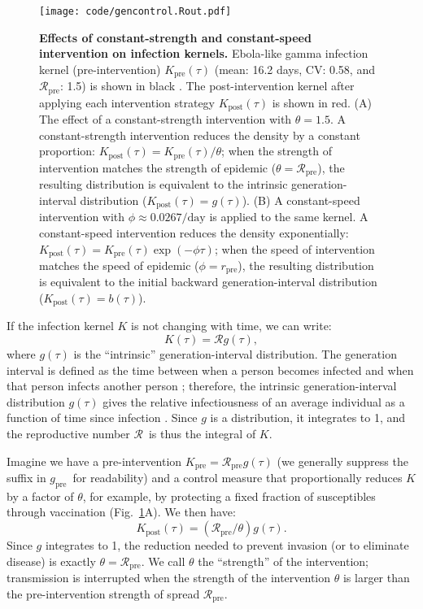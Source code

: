 \documentclass[12pt]{article}
\newcommand{\RR}{\ensuremath{{\mathcal R}}}
\newcommand{\Rx}[1]{\ensuremath{\RR_{\mathrm{#1}}}}
\newcommand{\Rpre}{\Rx{pre}}
\newcommand{\KK}{\ensuremath{{K}}}
\newcommand{\Kx}[1]{\ensuremath{\KK_{\mathrm{#1}}}}
\newcommand{\Kpre}{\Kx{pre}}
\newcommand{\Kpost}{\Kx{post}}
\newcommand{\ggg}{\ensuremath{{g}}}
\newcommand{\gx}[1]{\ensuremath{\ggg_{\mathrm{#1}}}}
\newcommand{\gpre}{\gx{pre}}
\newcommand{\rr}{\ensuremath{{r}}}
\newcommand{\rx}[1]{\ensuremath{\rr_{\mathrm{#1}}}}
\newcommand{\rpre}{\rx{pre}}
\newcommand{\figref}[1]{Fig.~\ref{fig:#1}}
\newcommand{\figlab}[1]{\label{fig:#1}}
\newcommand{\eqlab}[1]{\label{eq:#1}}
\begin{document}
\begin{figure}[!t]
\texttt{[image: code/gencontrol.Rout.pdf]}
\caption{
\textbf{Effects of constant-strength and constant-speed intervention on infection kernels.}
Ebola-like gamma infection kernel (pre-intervention) $\Kpre(\tau)$ (mean: 16.2 days, CV: 0.58, and \Rpre: 1.5) is shown in black \citep{park2019practical}.
The post-intervention kernel after applying each intervention strategy $\Kpost(\tau)$ is shown in red.
(A) The effect of a constant-strength intervention with $\theta = 1.5$.
A constant-strength intervention reduces the density by a constant proportion: $\Kpost(\tau) = \Kpre(\tau)/\theta$; when the strength of intervention matches the strength of epidemic ($\theta = \Rpre$), the resulting distribution is equivalent to the intrinsic generation-interval distribution ($\Kpost(\tau) = g(\tau)$).
(B) A constant-speed intervention with $\phi \approx 0.0267/\mathrm{day}$ is applied to the same kernel.
A constant-speed intervention reduces the density exponentially: $\Kpost(\tau) = \Kpre(\tau) \exp(-\phi \tau)$; when the speed of intervention matches the speed of epidemic ($\phi = \rpre$), the resulting distribution is equivalent to the initial backward generation-interval distribution ($\Kpost(\tau) = b(\tau)$). 
}
\figlab{constant}
\end{figure}

If the infection kernel $K$ is not changing with time, we can write:
\begin{equation}
	K(\tau) = \RR g(\tau),
	\eqlab{strengthFactors}
\end{equation}
where $g(\tau)$ is the ``intrinsic'' generation-interval distribution.
The generation interval is defined as the time between when a person becomes infected and when that person infects another person \citep{svensson2007note};
therefore, the intrinsic generation-interval distribution $g(\tau)$ gives the relative infectiousness of an average individual as a function of time since infection \citep{champredon2015intrinsic}. 
Since $g$ is a distribution, it integrates to 1, and the reproductive number \RR\ is thus the integral of $K$.

Imagine we have a pre-intervention $\Kpre = \Rpre g(\tau)$ (we generally suppress the suffix in \gpre\ for readability) and a control measure that proportionally reduces $K$ by a factor of $\theta$, for example, by protecting a fixed fraction of susceptibles through vaccination (\figref{constant}A). We then have:
\begin{equation}
	\Kpost(\tau) = (\Rpre/\theta) g(\tau).
\end{equation}
Since $g$ integrates to 1, the reduction needed to prevent invasion (or to eliminate disease) is exactly $\theta=\Rpre$. We call $\theta$ the ``strength'' of the intervention; transmission is interrupted when the strength of the intervention $\theta$ is larger than the pre-intervention strength of spread $\Rpre$.
\end{document}
